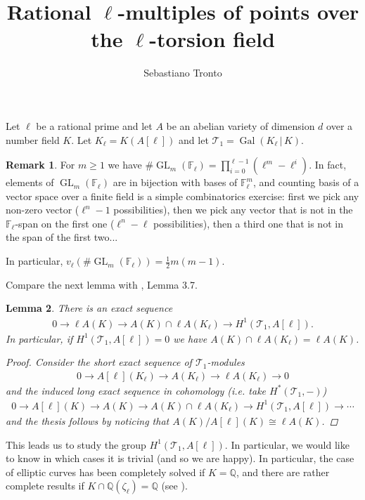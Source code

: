 \documentclass[10pt,a4paper]{article}
\title{Rational $\ell$-multiples of points over the $\ell$-torsion field}
\author{Sebastiano Tronto}
\DeclareMathOperator{\gal}{Gal}
\DeclareMathOperator{\gl}{GL}
\newcommand{\kiu}{\mathbb{Q}}
\newcommand{\F}{\mathbb{F}}
\newtheorem{lemma}{Lemma}
\theoremstyle{definition}
\newtheorem{remark}[lemma]{Remark}
\begin{document}
\maketitle

Let $\ell$ be a rational prime and let $A$ be an abelian variety of dimension $d$ over a number field $K$. Let $K_\ell=K(A[\ell])$ and let $\mathcal{T}_1=\gal(K_\ell\,|\,K)$.

\begin{remark}
For $m\geq 1$ we have $\#\gl_m(\F_\ell)=\prod_{i=0}^{\ell-1}(\ell^m-\ell^i)$. In fact, elements of $\gl_m(\F_\ell)$ are in bijection with bases of $\F^m_\ell$, and counting basis of a vector space over a finite field is a simple combinatorics exercise: first we pick any non-zero vector ($\ell^n-1$ possibilities), then we pick any vector that is not in the $\F_\ell$-span on the first one ($\ell^n-\ell$ possibilities), then a third one that is not in the span of the first two...

In particular, $v_\ell\left(\#\gl_m(\F_\ell)\right)=\frac{1}{2}m(m-1)$.
\end{remark}

Compare the next lemma with \cite{jr}, Lemma 3.7.

\begin{lemma}
There is an exact sequence
\begin{align*}
0\to \ell A(K) \to A(K)\cap \ell A(K_{\ell})\to H^1(\mathcal{T}_1,A[\ell]).
\end{align*}
In particular, if $H^1(\mathcal{T}_1,A[\ell])=0$ we have $A(K)\cap \ell A(K_\ell)=\ell A(K)$.
\begin{proof}
Consider the short exact sequence of $\mathcal{T}_1$-modules
\begin{align*}
0\to A[\ell](K_{\ell})\to A(K_{\ell})\to \ell A(K_{\ell})\to 0
\end{align*}
and the induced long exact sequence in cohomology (i.e. take $H^*(\mathcal{T}_1,-)$)
\begin{align*}
0\to A[\ell](K)\to A(K)\to A(K)\cap\ell A(K_{\ell})\to H^1(\mathcal{T}_1,A[\ell])\to\cdots
\end{align*}
and the thesis follows by noticing that $A(K)/A[\ell](K)\cong \ell A(K)$.
\end{proof}
\end{lemma}

This leads us to study the group $H^1(\mathcal{T}_1,A[\ell])$. In particular, we would like to know in which cases it is trivial (and so we are happy). In particular, the case of elliptic curves has been completely solved if $K=\kiu$, and there are rather complete results if $K\cap \kiu(\zeta_\ell)=\kiu$ (see \cite{lawson}).
\end{document}
